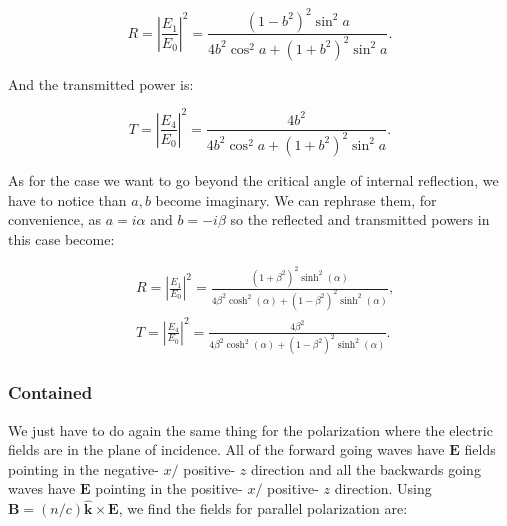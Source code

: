 \begin{equation}
	R=\left|\frac{E_{1}}{E_{0}}\right|^{2}=\frac{\left(1-b^{2}\right)^{2} \sin ^{2} a}{4 b^{2} \cos ^{2} a+\left(1+b^{2}\right)^{2} \sin ^{2} a}.
\end{equation}

And the transmitted power is:

\begin{equation}
	T=\left|\frac{E_{4}}{E_{0}}\right|^{2}=\frac{4 b^{2}}{4 b^{2} \cos ^{2} a+\left(1+b^{2}\right)^{2} \sin ^{2} a}.
\end{equation}

As for the case we want to go beyond the critical angle of internal reflection, we have to notice than $a,b$ become imaginary. We can rephrase them, for convenience, as $a = i \alpha$ and $b= - i \beta$ so the reflected and transmitted powers in this case become:

\begin{equation}
	\begin{split}
			&R=\left|\frac{E_{1}}{E_{0}}\right|^{2}=\frac{\left(1+\beta^{2}\right)^{2} \sinh ^{2}(\alpha)}{4 \beta^{2} \cosh ^{2}(\alpha)+\left(1-\beta^{2}\right)^{2} \sinh ^{2}(\alpha)},\\
			&T=\left|\frac{E_{4}}{E_{0}}\right|^{2}=\frac{4 \beta^{2}}{4 \beta^{2} \cosh ^{2}(\alpha)+\left(1-\beta^{2}\right)^{2} \sinh ^{2}(\alpha)}.
	\end{split}
\end{equation}

\subsubsection*{Contained}

We just have to do again  the same thing for the polarization where the electric fields are in the plane of incidence. All of the forward going waves have $\mathbf{E}$ fields pointing in the negative- $x /$ positive- $z$ direction and all the backwards going waves have $\mathbf{E}$ pointing in the positive- $x /$ positive- $z$ direction. Using $\mathbf{B}=(n / c) \hat{\mathbf{k}} \times \mathbf{E}$, we find the fields for parallel polarization are:

